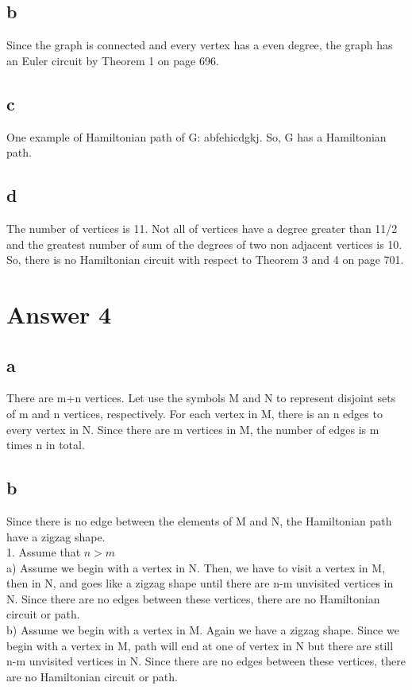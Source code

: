 \documentclass[11pt]{article}
\begin{document}
\subsection*{b}
Since the graph is connected and every vertex has a even degree, the graph has an Euler circuit by Theorem 1 on page 696.
\subsection*{c}
One example of Hamiltonian path of G: abfehicdgkj. So, G has a Hamiltonian path.
\subsection*{d}
The number of vertices is 11. Not all of vertices have a degree greater than 11/2 and the greatest number of sum of the degrees of two non adjacent vertices is 10. So, there is no Hamiltonian circuit with respect to Theorem 3 and 4 on page 701.
\section*{Answer 4}
\subsection*{a}
There are m+n vertices. Let use the symbols M and N to represent disjoint sets of m and n vertices, respectively. For each vertex in M, there is an n edges to every vertex in N. Since there are m vertices in M, the number of edges is m times n in total.
\subsection*{b}
Since there is no edge between the elements of M and N, the Hamiltonian path have a zigzag shape.\\

1. Assume that $n>m$\\
a) Assume we begin with a vertex in N. Then, we have to visit a vertex in M, then in N, and goes like a zigzag shape until there are n-m unvisited vertices in N. Since there are no edges between these vertices, there are no Hamiltonian circuit or path.\\
b) Assume we begin with a vertex in M. Again we have a zigzag shape. Since we begin with a vertex in M, path will end at one of vertex in N but there are still n-m unvisited vertices in N. Since there are no edges between these vertices, there are no Hamiltonian circuit or path.\\
\end{document}
